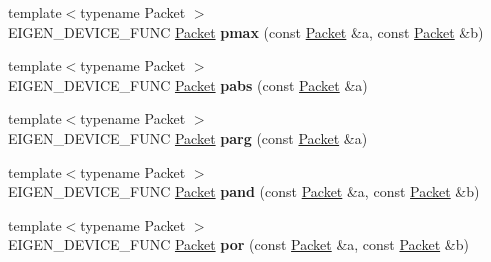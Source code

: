 \begin{DoxyCompactItemize}
{\footnotesize template$<$typename Packet $>$ }\\E\+I\+G\+E\+N\+\_\+\+D\+E\+V\+I\+C\+E\+\_\+\+F\+U\+NC \hyperlink{union_eigen_1_1internal_1_1_packet}{Packet} {\bfseries pmax} (const \hyperlink{union_eigen_1_1internal_1_1_packet}{Packet} \&a, const \hyperlink{union_eigen_1_1internal_1_1_packet}{Packet} \&b)
\item 
\mbox{\label{namespace_eigen_1_1internal_a9e0c497a439c608a95c28af90684a0e6}} 
{\footnotesize template$<$typename Packet $>$ }\\E\+I\+G\+E\+N\+\_\+\+D\+E\+V\+I\+C\+E\+\_\+\+F\+U\+NC \hyperlink{union_eigen_1_1internal_1_1_packet}{Packet} {\bfseries pabs} (const \hyperlink{union_eigen_1_1internal_1_1_packet}{Packet} \&a)
\item 
\mbox{\label{namespace_eigen_1_1internal_a20fb36c272856891c33ffd883c6aa508}} 
{\footnotesize template$<$typename Packet $>$ }\\E\+I\+G\+E\+N\+\_\+\+D\+E\+V\+I\+C\+E\+\_\+\+F\+U\+NC \hyperlink{union_eigen_1_1internal_1_1_packet}{Packet} {\bfseries parg} (const \hyperlink{union_eigen_1_1internal_1_1_packet}{Packet} \&a)
\item 
\mbox{\label{namespace_eigen_1_1internal_addb183b5d88afb48c715db609ad8015e}} 
{\footnotesize template$<$typename Packet $>$ }\\E\+I\+G\+E\+N\+\_\+\+D\+E\+V\+I\+C\+E\+\_\+\+F\+U\+NC \hyperlink{union_eigen_1_1internal_1_1_packet}{Packet} {\bfseries pand} (const \hyperlink{union_eigen_1_1internal_1_1_packet}{Packet} \&a, const \hyperlink{union_eigen_1_1internal_1_1_packet}{Packet} \&b)
\item 
\mbox{\label{namespace_eigen_1_1internal_a70f7fdcb68cddd1d00fbd9bea3687daa}} 
{\footnotesize template$<$typename Packet $>$ }\\E\+I\+G\+E\+N\+\_\+\+D\+E\+V\+I\+C\+E\+\_\+\+F\+U\+NC \hyperlink{union_eigen_1_1internal_1_1_packet}{Packet} {\bfseries por} (const \hyperlink{union_eigen_1_1internal_1_1_packet}{Packet} \&a, const \hyperlink{union_eigen_1_1internal_1_1_packet}{Packet} \&b)
\item 
\mbox{\label{namespace_eigen_1_1internal_a55d803cfd28067f796e12df8eb7e4354}} 

\end{DoxyCompactItemize}
